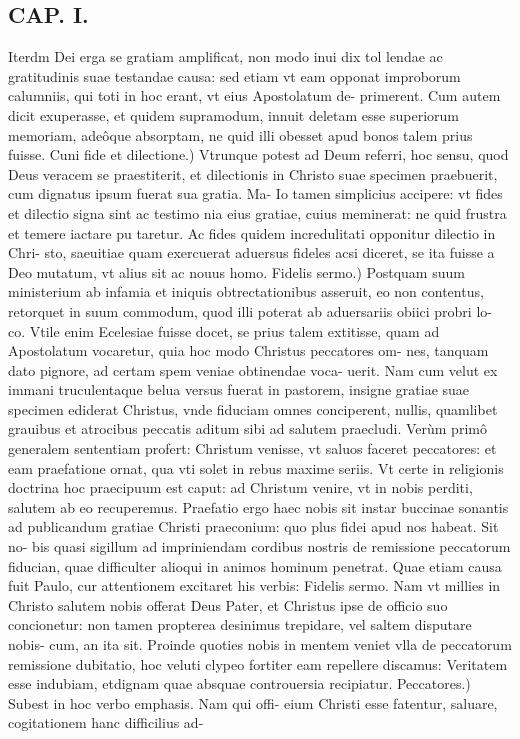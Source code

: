 \documentclass{article}
\begin{document}
\begin{pages}
\section*{CAP. I. }
\marginpar{[ p.11 ]}\pstart Iterdm Dei erga se gratiam amplificat, non modo inui dix tol lendae ac gratitudinis suae testandae causa: sed etiam vt eam opponat improborum calumniis, qui toti in hoc erant, vt eius Apostolatum de- primerent. Cum autem dicit exuperasse, et quidem supramodum, innuit deletam esse superiorum memoriam, adeôque absorptam, ne quid illi obesset apud bonos talem prius fuisse.  \pend\pstart Cuni fide et dilectione.) Vtrunque potest ad Deum referri, hoc sensu, quod Deus veracem se praestiterit, et dilectionis in Christo suae specimen praebuerit, cum dignatus ipsum fuerat sua gratia. Ma- Io tamen simplicius accipere: vt fides et dilectio signa sint ac testimo nia eius gratiae, cuius meminerat: ne quid frustra et temere iactare pu taretur. Ac fides quidem incredulitati opponitur dilectio in Chri- sto, saeuitiae quam exercuerat aduersus fideles acsi diceret, se ita fuisse a Deo mutatum, vt alius sit ac nouus homo.  \pend\pstart Fidelis sermo.) Postquam suum ministerium ab infamia et iniquis obtrectationibus asseruit, eo non contentus, retorquet in suum commodum, quod illi poterat ab aduersariis obiici probri lo- co. Vtile enim Ecelesiae fuisse docet, se prius talem extitisse, quam ad Apostolatum vocaretur, quia hoc modo Christus peccatores om- nes, tanquam dato pignore, ad certam spem veniae obtinendae voca- uerit. Nam cum velut ex immani truculentaque belua versus fuerat in pastorem, insigne gratiae suae specimen ediderat Christus, vnde fiduciam omnes conciperent, nullis, quamlibet grauibus et atrocibus peccatis aditum sibi ad salutem praecludi. Verùm primô generalem sententiam profert: Christum venisse, vt saluos faceret peccatores: et eam praefatione ornat, qua vti solet in rebus maxime seriis. Vt certe in religionis doctrina hoc praecipuum est caput: ad Christum venire, vt in nobis perditi, salutem ab eo recuperemus. Praefatio ergo haec nobis sit instar buccinae sonantis ad publicandum gratiae Christi praeconium: quo plus fidei apud nos habeat. Sit no- bis quasi sigillum ad impriniendam cordibus nostris de remissione peccatorum fiducian, quae difficulter alioqui in animos hominum penetrat. Quae etiam causa fuit Paulo, cur attentionem excitaret his verbis: Fidelis sermo. Nam vt millies in Christo salutem nobis offerat Deus Pater, et Christus ipse de officio suo concionetur: non tamen propterea desinimus trepidare, vel saltem disputare nobis- cum, an ita sit. Proinde quoties nobis in mentem veniet vlla de peccatorum remissione dubitatio, hoc veluti clypeo fortiter eam repellere discamus: Veritatem esse indubiam, etdignam quae absquae controuersia recipiatur.  \pend\pstart Peccatores.) Subest in hoc verbo emphasis. Nam qui offi- eium Christi esse fatentur, saluare, cogitationem hanc difficilius ad-  \pend

\end{pages}
\end{document}
